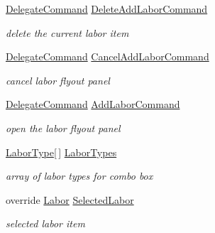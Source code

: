 \begin{DoxyCompactItemize}
\hyperlink{class_delegate_command}{Delegate\+Command} \hyperlink{class_field_service_1_1_win_r_t_1_1_view_models_1_1_labor_view_model_a2915a39aca10ff5e1116a179245f7e50}{Delete\+Add\+Labor\+Command}
\begin{DoxyCompactList}\small\item\em delete the current labor item \end{DoxyCompactList}\item 
\hyperlink{class_delegate_command}{Delegate\+Command} \hyperlink{class_field_service_1_1_win_r_t_1_1_view_models_1_1_labor_view_model_a145347d9840f8e0a3147ae4707332766}{Cancel\+Add\+Labor\+Command}
\begin{DoxyCompactList}\small\item\em cancel labor flyout panel \end{DoxyCompactList}\item 
\hyperlink{class_delegate_command}{Delegate\+Command} \hyperlink{class_field_service_1_1_win_r_t_1_1_view_models_1_1_labor_view_model_a541af1cc093fb0d2faa9efbc92a2b262}{Add\+Labor\+Command}
\begin{DoxyCompactList}\small\item\em open the labor flyout panel \end{DoxyCompactList}\item 
\hyperlink{namespace_field_service_1_1_data_a20c89d9b67c465f840b3ef27a026afd6}{Labor\+Type}\mbox{[}$\,$\mbox{]} \hyperlink{class_field_service_1_1_win_r_t_1_1_view_models_1_1_labor_view_model_a8b8b67bc1de70f6d486a9ebeee28e071}{Labor\+Types}
\begin{DoxyCompactList}\small\item\em array of labor types for combo box \end{DoxyCompactList}\item 
override \hyperlink{class_field_service_1_1_data_1_1_labor}{Labor} \hyperlink{class_field_service_1_1_win_r_t_1_1_view_models_1_1_labor_view_model_a9846440c9cd2d7fe810368b92518f8b8}{Selected\+Labor}
\begin{DoxyCompactList}\small\item\em selected labor item \end{DoxyCompactList}\item 

\end{DoxyCompactItemize}
